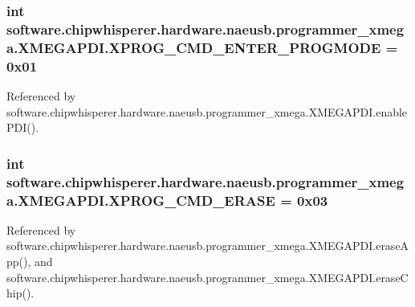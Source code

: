 \subsubsection[{X\+P\+R\+O\+G\+\_\+\+C\+M\+D\+\_\+\+E\+N\+T\+E\+R\+\_\+\+P\+R\+O\+G\+M\+O\+D\+E}]{\setlength{\rightskip}{0pt plus 5cm}int software.\+chipwhisperer.\+hardware.\+naeusb.\+programmer\+\_\+xmega.\+X\+M\+E\+G\+A\+P\+D\+I.\+X\+P\+R\+O\+G\+\_\+\+C\+M\+D\+\_\+\+E\+N\+T\+E\+R\+\_\+\+P\+R\+O\+G\+M\+O\+D\+E = 0x01\hspace{0.3cm}{\ttfamily [static]}}\label{classsoftware_1_1chipwhisperer_1_1hardware_1_1naeusb_1_1programmer__xmega_1_1XMEGAPDI_ab945598a0c16f225491f9e1b1ce6e563}


Referenced by software.\+chipwhisperer.\+hardware.\+naeusb.\+programmer\+\_\+xmega.\+X\+M\+E\+G\+A\+P\+D\+I.\+enable\+P\+D\+I().

\hypertarget{classsoftware_1_1chipwhisperer_1_1hardware_1_1naeusb_1_1programmer__xmega_1_1XMEGAPDI_a7157232228628888a519f63f1349e4ec}{}
\subsubsection[{X\+P\+R\+O\+G\+\_\+\+C\+M\+D\+\_\+\+E\+R\+A\+S\+E}]{\setlength{\rightskip}{0pt plus 5cm}int software.\+chipwhisperer.\+hardware.\+naeusb.\+programmer\+\_\+xmega.\+X\+M\+E\+G\+A\+P\+D\+I.\+X\+P\+R\+O\+G\+\_\+\+C\+M\+D\+\_\+\+E\+R\+A\+S\+E = 0x03\hspace{0.3cm}{\ttfamily [static]}}\label{classsoftware_1_1chipwhisperer_1_1hardware_1_1naeusb_1_1programmer__xmega_1_1XMEGAPDI_a7157232228628888a519f63f1349e4ec}


Referenced by software.\+chipwhisperer.\+hardware.\+naeusb.\+programmer\+\_\+xmega.\+X\+M\+E\+G\+A\+P\+D\+I.\+erase\+App(), and software.\+chipwhisperer.\+hardware.\+naeusb.\+programmer\+\_\+xmega.\+X\+M\+E\+G\+A\+P\+D\+I.\+erase\+Chip().

